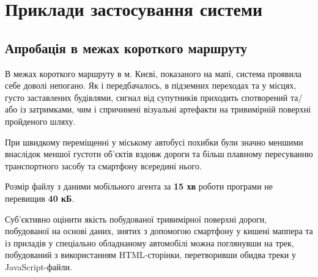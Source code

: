 \documentclass[simple,a4paper,14pt,ukrainian,utf8]{eskdtext}
\begin{document}
    \clearpage \newpage 
    
    \section{Приклади застосування системи}

	\subsection{Апробація в межах короткого маршруту}
	
	В межах короткого маршруту в м. Києві, показаного на мапі, система проявила себе доволі непогано. Як і передбачалось, в підземних переходах та у місцях, густо заставлених будівлями, сигнал від супутників приходить спотворений та/або із затримками, чим і спричинені візуальні артефакти на тривимірній поверхні пройденого шляху.
	
	При швидкому переміщенні у міському автобусі похибки були значно меншими внаслідок меншої густоти об’єктів вздовж дороги та більш плавному пересуванню транспортного засобу та смартфону всередині нього.
	
	Розмір файлу з даними мобільного агента за \textbf{15 хв} роботи програми не перевищив \textbf{40 кБ}.
	
	Суб’єктивно оцінити якість побудованої тривимірної поверхні дороги, побудованої на основі даних, знятих з допомогою смартфону у кишені маппера та із приладів у спеціально обладнаному автомобілі можна поглянувши на трек, побудований з використанням HTML-сторінки, перетворивши обидва треки у JavaScript-файли.
	
\end{document}
